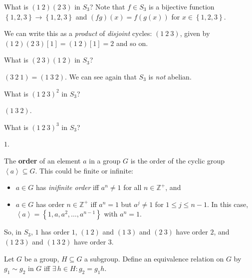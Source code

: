 \documentclass{notes}
\begin{document}
\begin{eg}
  What is $(1\ 2) (2\ 3)$ in $S_3$?
  Note that $f \in S_3$ is a bijective function $\left \{ 1, 2, 3 \right \} \to \left \{ 1, 2, 3 \right \}$ and $(f g)(x) = f(g(x))$ for $x \in \left \{ 1, 2, 3 \right \}$.

  We can write this as a \textit{product} of \textit{disjoint} cycles: $(1\ 2\ 3)$, given by $(1\ 2) (2\ 3)[1] = (1\ 2)[1] = 2$ and so on.
\end{eg}

\begin{eg}
  What is $(2\ 3) (1\ 2)$ in $S_3$?

  $(3\ 2\ 1) = (1\ 3\ 2)$.
  We can see again that $S_3$ is \textit{not} abelian.
\end{eg}

\begin{eg}
  What is $(1\ 2\ 3)^2$ in $S_3$?

  $(1\ 3\ 2)$.
\end{eg}

\begin{eg}
  What is $(1\ 2\ 3)^3$ in $S_3$?

  $1$.
\end{eg}

\begin{defn}
  The {\boldmath \bfseries order} of an element $a$ in a group $G$ is the order of the cyclic group $\left \langle a \right \rangle \subseteq G$.
  This could be finite or infinite: 
  \begin{itemize}
    \item $a \in G$ has \textit{inifinite order} iff $a^n \neq 1$ for all $n \in \mathbb Z^+$, and 

    \item $a \in G$ has order $n \in \mathbb Z^+$ iff $a^n = 1$ but $a^j \neq 1$ for $1 \leq j \leq n - 1$.
    In this case, $\left \langle a \right \rangle = \left \{ 1, a, a^2, \dots, a^{n - 1} \right \}$ with $a^n = 1$.
  \end{itemize}
\end{defn}

So, in $S_3$, $1$ has order $1$, $(1\ 2)$ and $(1\ 3)$ and $(2\ 3)$ have order $2$, and $(1\ 2\ 3)$ and $(1\ 3\ 2)$ have order $3$.

\underline{}

Let $G$ be a group, $H \subseteq G$ a subgroup.
Define an equivalence relation on $G$ by $g_1 \sim g_2$ in $G$ iff $\exists \, h \in H: g_2 = g_1 h$.
\end{document}
